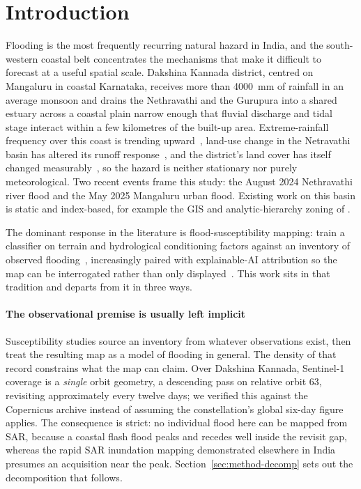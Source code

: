 \documentclass[10pt,twocolumn]{article}
\begin{document}




\section{Introduction}
\label{sec:intro}

Flooding is the most frequently recurring natural hazard in India, and the
south-western coastal belt concentrates the mechanisms that make it difficult to
forecast at a useful spatial scale. Dakshina Kannada district, centred on
Mangaluru in coastal Karnataka, receives more than \SI{4000}{\milli\metre} of
rainfall in an average monsoon and drains the Nethravathi and the Gurupura into a
shared estuary across a coastal plain narrow enough that fluvial discharge and
tidal stage interact within a few kilometres of the built-up area.
Extreme-rainfall frequency over this coast is trending
upward~\citep{chandrashekar2018}, land-use change in the Netravathi basin has
altered its runoff response~\citep{chandana2023,babar2015}, and the district's
land cover has itself changed measurably~\citep{naik2022}, so the hazard is
neither stationary nor purely meteorological. Two recent events frame this study:
the August 2024 Nethravathi river flood and the May 2025 Mangaluru urban flood.
Existing work on this basin is static and index-based, for example the GIS and
analytic-hierarchy zoning of \citet{nirmala2026}.

The dominant response in the literature is flood-susceptibility mapping: train a
classifier on terrain and hydrological conditioning factors against an inventory
of observed flooding~\citep{tehrany2014,khosravi2018,arabameri2019,saha2021},
increasingly paired with explainable-AI attribution so the map can be
interrogated rather than only
displayed~\citep{lundberg2017,aydin2022,seydi2023}. This work sits in that
tradition and departs from it in three ways.

\paragraph{The observational premise is usually left implicit}
Susceptibility studies source an inventory from whatever observations exist, then
treat the resulting map as a model of flooding in general. The density of that
record constrains what the map can claim. Over Dakshina Kannada,
Sentinel-1~\citep{torres2012} coverage is a \emph{single} orbit geometry, a
descending pass on relative orbit 63, revisiting approximately every twelve days;
we verified this against the Copernicus archive instead of assuming the
constellation's global six-day figure applies. The consequence is strict: no
individual flood here can be mapped from SAR, because a coastal flash flood peaks
and recedes well inside the revisit gap, whereas the rapid SAR inundation mapping
demonstrated elsewhere in India~\citep{arora2023} presumes an acquisition near
the peak. Section~\ref{sec:method-decomp} sets out the decomposition that
follows.
\end{document}
